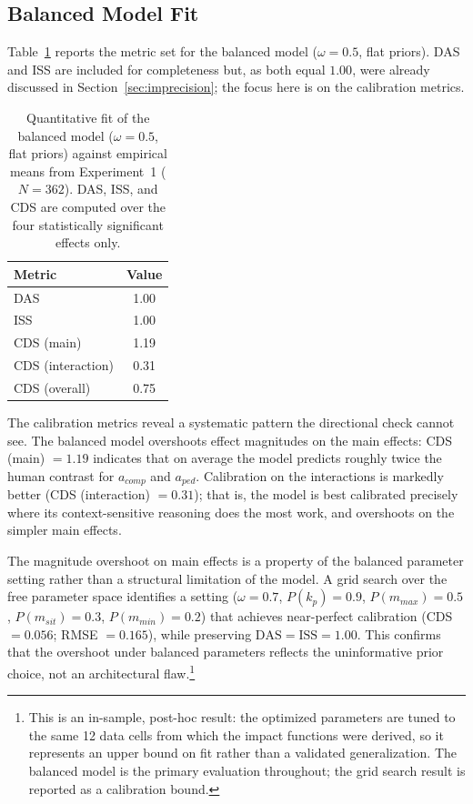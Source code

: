\documentclass[12pt,a4paper]{article}
\begin{document}
\subsection{Balanced Model Fit}
\label{sec:balancedfit}

Table~\ref{tab:balanced_fit} reports the metric set for the balanced model
($\omega = 0.5$, flat priors). DAS and ISS are included for completeness but,
as both equal $1.00$, were already discussed in Section~\ref{sec:imprecision};
the focus here is on the calibration metrics.

\begin{table}[t!]
\centering
\caption{Quantitative fit of the balanced model ($\omega=0.5$, flat priors)
         against empirical means from Experiment~1 ($N=362$). DAS, ISS, and
         CDS are computed over the four statistically significant effects only.}
\label{tab:balanced_fit}
\begin{tabular}{lc}
\toprule
Metric & Value \\
\midrule
DAS              & 1.00 \\
ISS              & 1.00 \\
CDS (main)        & 1.19 \\
CDS (interaction) & 0.31 \\
CDS (overall)     & 0.75 \\
\bottomrule
\end{tabular}
\end{table}

The calibration metrics reveal a systematic pattern the directional check cannot
see. The balanced model overshoots effect magnitudes on the main effects: CDS
(main) $= 1.19$ indicates that on average the model predicts roughly twice the
human contrast for $a_{comp}$ and $a_{ped}$. Calibration on the interactions is
markedly better (CDS (interaction) $= 0.31$); that is, the model is best
calibrated precisely where its context-sensitive reasoning does the most work,
and overshoots on the simpler main effects.

The magnitude overshoot on main effects is a property of the balanced parameter
setting rather than a structural limitation of the model. A grid search over the
free parameter space identifies a setting ($\omega = 0.7$, $P(k_p) = 0.9$,
$P(m_{max}) = 0.5$, $P(m_{sit}) = 0.3$, $P(m_{min}) = 0.2$) that achieves
near-perfect calibration (CDS $= 0.056$; RMSE $= 0.165$), while preserving
$\mathrm{DAS} = \mathrm{ISS} = 1.00$. This confirms that the overshoot under
balanced parameters reflects the uninformative prior choice, not an architectural
flaw.\footnote{This is an in-sample, post-hoc result: the optimized parameters
are tuned to the same 12 data cells from which the impact functions were derived,
so it represents an upper bound on fit rather than a validated generalization.
The balanced model is the primary evaluation throughout; the grid search result
is reported as a calibration bound.}
\end{document}

